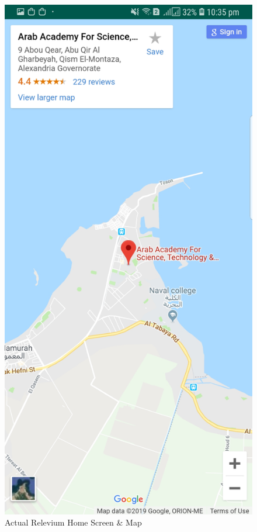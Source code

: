 \documentclass{scrreprt}
\begin{document}
\begin{figure}[ht!]
    \includegraphics[height=0.6\textheight]{AppDesign/actualDesign/Map.jpg}
    \caption[Actual Relevium Home Screen \& Map]{Actual Relevium Home Screen \& Map}%
    \label{fig:Actual_Draft1}%
  \end{figure}
\end{document}
